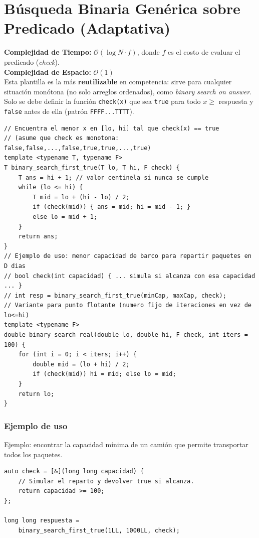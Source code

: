 \documentclass[10pt,twocolumn,letterpaper]{report}
\begin{document}
\section{Búsqueda Binaria Genérica sobre Predicado (Adaptativa)}
\textbf{Complejidad de Tiempo:} $\mathcal{O}(\log N \cdot f)$, donde $f$ es el costo de evaluar el predicado (\textit{check}). \\
\textbf{Complejidad de Espacio:} $\mathcal{O}(1)$ \\
Esta plantilla es la más \textbf{reutilizable} en competencia: sirve para cualquier situación monótona (no solo arreglos ordenados), como \textit{binary search on answer}. Solo se debe definir la función \texttt{check(x)} que sea \texttt{true} para todo $x \geq$ respuesta y \texttt{false} antes de ella (patrón \texttt{FFFF...TTTT}).
\begin{lstlisting}
// Encuentra el menor x en [lo, hi] tal que check(x) == true
// (asume que check es monotona: false,false,...,false,true,true,...,true)
template <typename T, typename F>
T binary_search_first_true(T lo, T hi, F check) {
    T ans = hi + 1; // valor centinela si nunca se cumple
    while (lo <= hi) {
        T mid = lo + (hi - lo) / 2;
        if (check(mid)) { ans = mid; hi = mid - 1; }
        else lo = mid + 1;
    }
    return ans;
}
// Ejemplo de uso: menor capacidad de barco para repartir paquetes en D dias
// bool check(int capacidad) { ... simula si alcanza con esa capacidad ... }
// int resp = binary_search_first_true(minCap, maxCap, check);
// Variante para punto flotante (numero fijo de iteraciones en vez de lo<=hi)
template <typename F>
double binary_search_real(double lo, double hi, F check, int iters = 100) {
    for (int i = 0; i < iters; i++) {
        double mid = (lo + hi) / 2;
        if (check(mid)) hi = mid; else lo = mid;
    }
    return lo;
}
\end{lstlisting}
\subsubsection*{Ejemplo de uso}
Ejemplo: encontrar la capacidad mínima de un camión que permite transportar todos los paquetes.
\begin{lstlisting}
auto check = [&](long long capacidad) {
    // Simular el reparto y devolver true si alcanza.
    return capacidad >= 100;
};

long long respuesta =
    binary_search_first_true(1LL, 1000LL, check);
\end{lstlisting}
\end{document}
